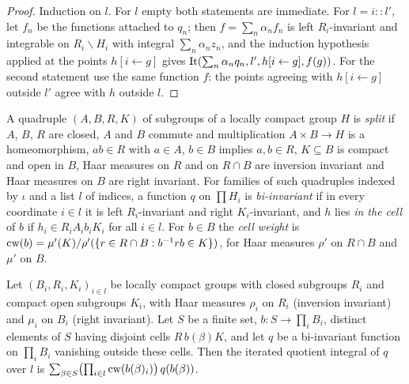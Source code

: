 \begin{proof}
Induction on $l$. For $l$ empty both statements are immediate. For $l=i::l'$, let $f_n$ be the functions attached to
$q_n$; then $f=\sum_n\alpha_nf_n$ is left $R_i$-invariant and integrable on $R_i\backslash H_i$ with integral
$\sum_n\alpha_nz_n$, and the induction hypothesis applied at the points $h[i\leftarrow g]$ gives
$\mathrm{It}(\sum_n\alpha_nq_n,l',h[i\leftarrow g],f(g))$. For the second statement use the same function $f$: the
points agreeing with $h[i\leftarrow g]$ outside $l'$ agree with $h$ outside $l$.
\end{proof}

\begin{definition}\label{def:pf:rowprops:cells}
A quadruple $(A,B,R,K)$ of subgroups of a locally compact group $H$ is \emph{split} if $A$, $B$, $R$ are closed, $A$ and
$B$ commute and multiplication $A\times B\to H$ is a homeomorphism, $ab\in R$ with $a\in A$, $b\in B$ implies $a,b\in R$,
$K\subseteq B$ is compact and open in $B$, Haar measures on $R$ and on $R\cap B$ are inversion invariant and Haar measures on
$B$ are right invariant. For families of such quadruples indexed by $\iota$ and a list $l$ of indices, a function $q$ on
$\prod H_i$ is \emph{bi-invariant} if in every coordinate $i\in l$ it is left $R_i$-invariant and right $K_i$-invariant,
and $h$ lies \emph{in the cell} of $b$ if $h_i\in R_iA_ib_iK_i$ for all $i\in l$. For $b\in B$ the \emph{cell weight} is
$\mathrm{cw}(b)=\mu'(K)/\rho'(\{r\in R\cap B: b^{-1}rb\in K\})$, for Haar measures $\rho'$ on $R\cap B$ and $\mu'$ on $B$.
\end{definition}

\begin{lemma}\label{pf:rowprops:cellsum}
Let $(B_i,R_i,K_i)_{i\in l}$ be locally compact groups with closed subgroups $R_i$ and compact open subgroups $K_i$, with
Haar measures $\rho_i$ on $R_i$ (inversion invariant) and $\mu_i$ on $B_i$ (right invariant). Let $S$ be a finite set,
$b:S\to\prod_iB_i$, distinct elements of $S$ having disjoint cells $R\,b(\beta)K$, and let $q$ be a bi-invariant function on
$\prod_iB_i$ vanishing outside these cells. Then the iterated quotient integral of $q$ over $l$ is
$\sum_{\beta\in S}\bigl(\prod_{i\in l}\mathrm{cw}(b(\beta)_i)\bigr)\,q(b(\beta))$.
\end{lemma}

